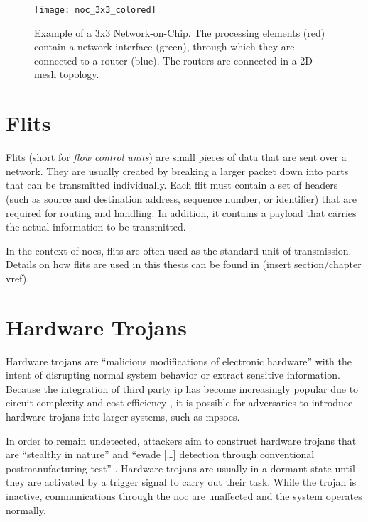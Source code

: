 \begin{figure}
    \centering
    \texttt{[image: noc\_3x3\_colored]}
    \caption[Example of a 3x3 NoC]{Example of a 3x3 Network-on-Chip. The processing elements (red) contain a network interface
    (green), through which they are connected to a router (blue). The routers are connected in a 2D mesh topology.}
    \label{fig:nocexample}
\end{figure}

\section{Flits}\label{sec:flits}
Flits (short for \textit{flow control units}) are small pieces of data that are sent over a network. They are usually created by breaking a larger
packet down into parts that can be transmitted individually. \cite[6]{flitslecturecmu} Each flit must contain a set of headers (such as source and
destination address, sequence number, or identifier) that are required for routing and handling. \cite[2]{flitslectureutah} In addition, it contains
a payload that carries the actual information to be transmitted.

In the context of \glspl{noc}, flits are often used as the standard unit of transmission. \cite[51\psqq]{tatas16designingnocs} Details on how flits
are used in this thesis can be found in (insert section/chapter vref).

\section{Hardware Trojans}\label{sec:hardwaretrojans}
Hardware trojans are \enquote{malicious modifications of electronic hardware} \cite[1]{bhunia14hardwaretrojans} with the intent of disrupting normal
system behavior or extract sensitive information. Because the integration of third party \gls{ip} has become increasingly popular due to circuit
complexity and cost efficiency \cites[1]{ancajas14fortnocs}[2]{bhunia14hardwaretrojans}, it is possible for adversaries to introduce hardware
trojans into larger systems, such as \glspl{mpsoc}.

In order to remain undetected, attackers aim to construct hardware trojans that are \enquote{stealthy in nature} \cite[1]{bhunia14hardwaretrojans}
and \enquote{evade […] detection through conventional postmanufacturing test} \cite[1]{bhunia14hardwaretrojans}. Hardware trojans are usually in a
dormant state until they are activated by a trigger signal to carry out their task. \cites{bhunia14hardwaretrojans}{ancajas14fortnocs} While the
trojan is inactive, communications through the \gls{noc} are unaffected and the system operates normally.

